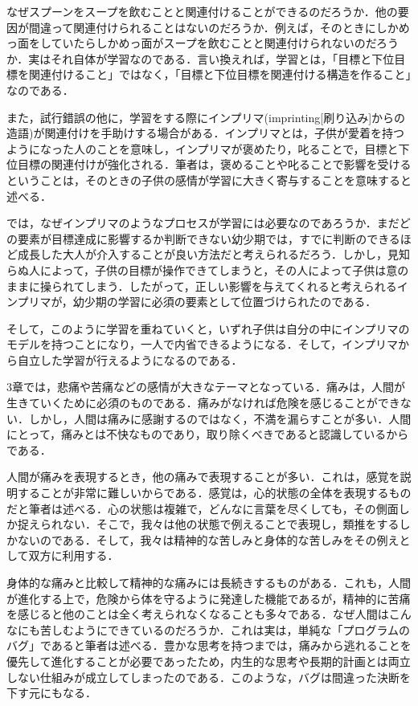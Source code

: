 \documentclass{jarticle}
\begin{document}
なぜスプーンをスープを飲むことと関連付けることができるのだろうか．他の要因が間違って関連付けられることはないのだろうか．例えば，そのときにしかめっ面をしていたらしかめっ面がスープを飲むことと関連付けられないのだろうか．実はそれ自体が学習なのである．言い換えれば，学習とは，「目標と下位目標を関連付けること」ではなく，「目標と下位目標を関連付ける構造を作ること」なのである．

また，試行錯誤の他に，学習をする際にインプリマ(imprinting[刷り込み]からの造語)が関連付けを手助けする場合がある．インプリマとは，子供が愛着を持つようになった人のことを意味し，インプリマが褒めたり，叱ることで，目標と下位目標の関連付けが強化される．筆者は，褒めることや叱ることで影響を受けるということは，そのときの子供の感情が学習に大きく寄与することを意味すると述べる．

では，なぜインプリマのようなプロセスが学習には必要なのであろうか．まだどの要素が目標達成に影響するか判断できない幼少期では，すでに判断のできるほど成長した大人が介入することが良い方法だと考えられるだろう．しかし，見知らぬ人によって，子供の目標が操作できてしまうと，その人によって子供は意のままに操られてしまう．したがって，正しい影響を与えてくれると考えられるインプリマが，幼少期の学習に必須の要素として位置づけられたのである．

そして，このように学習を重ねていくと，いずれ子供は自分の中にインプリマのモデルを持つことになり，一人で内省できるようになる．そして，インプリマから自立した学習が行えるようになるのである．





3章では，悲痛や苦痛などの感情が大きなテーマとなっている．痛みは，人間が生きていくために必須のものである．痛みがなければ危険を感じることができない．しかし，人間は痛みに感謝するのではなく，不満を漏らすことが多い．人間にとって，痛みとは不快なものであり，取り除くべきであると認識しているからである．

人間が痛みを表現するとき，他の痛みで表現することが多い．これは，感覚を説明することが非常に難しいからである．感覚は，心的状態の全体を表現するものだと筆者は述べる．心の状態は複雑で，どんなに言葉を尽くしても，その側面しか捉えられない．そこで，我々は他の状態で例えることで表現し，類推をするしかないのである．そして，我々は精神的な苦しみと身体的な苦しみをその例えとして双方に利用する．

身体的な痛みと比較して精神的な痛みには長続きするものがある．これも，人間が進化する上で，危険から体を守るように発達した機能であるが，精神的に苦痛を感じると他のことは全く考えられなくなることも多々である．なぜ人間はこんなにも苦しむようにできているのだろうか．これは実は，単純な「プログラムのバグ」であると筆者は述べる．豊かな思考を持つまでは，痛みから逃れることを優先して進化することが必要であったため，内生的な思考や長期的計画とは両立しない仕組みが成立してしまったのである．このような，バグは間違った決断を下す元にもなる．
\end{document}
